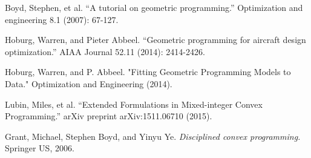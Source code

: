\documentclass[]{article}
\begin{document}
\begin{thebibliography}{9}

Boyd, Stephen, et al. ``A tutorial on geometric programming.'' Optimization and engineering 8.1 (2007): 67-127.

Hoburg, Warren, and Pieter Abbeel. ``Geometric programming for aircraft design optimization.'' AIAA Journal 52.11 (2014): 2414-2426.

Hoburg, Warren, and P. Abbeel. "Fitting Geometric Programming Models to Data." Optimization and Engineering (2014).

Lubin, Miles, et al. ``Extended Formulations in Mixed-integer Convex Programming.'' arXiv preprint arXiv:1511.06710 (2015).

Grant, Michael, Stephen Boyd, and Yinyu Ye. \textit{Disciplined convex programming.} Springer US, 2006.

\end{thebibliography}
\end{document}

